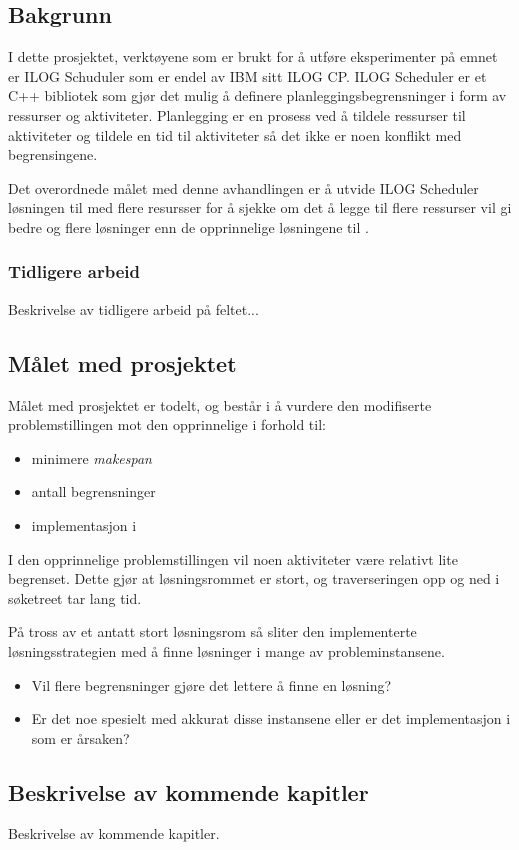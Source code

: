 \subsection{Bakgrunn}
I dette prosjektet, verktøyene som er brukt for å utføre eksperimenter på emnet er ILOG Schuduler som er endel av IBM sitt ILOG CP. ILOG Scheduler er et C++ bibliotek som gjør det mulig å definere planleggingsbegrensninger i form av ressurser og aktiviteter. Planlegging er en prosess ved å tildele ressurser til aktiviteter og tildele en tid til aktiviteter så det ikke er noen konflikt med begrensingene.\cite{Pape94implementationof}

Det overordnede målet med denne avhandlingen er å utvide ILOG Scheduler løsningen til \bht med flere resursser for å sjekke om det å legge til flere ressurser vil gi bedre og flere løsninger enn de opprinnelige løsningene til \bht.

\subsubsection{Tidligere arbeid}
Beskrivelse av tidligere arbeid på feltet...

\subsection{Målet med prosjektet}
Målet med prosjektet er todelt, og består i å vurdere den modifiserte problemstillingen mot den opprinnelige i forhold til:
\begin{itemize}
\item minimere \textit{makespan}
\item antall begrensninger
\item implementasjon i \ilog
\end{itemize}

I den opprinnelige problemstillingen vil noen aktiviteter være relativt lite begrenset. Dette gjør at løsningsrommet er stort, og traverseringen opp og ned i søketreet tar lang tid.

På tross av et antatt stort løsningsrom så sliter den \ilog implementerte løsningsstrategien med å finne løsninger i mange av probleminstansene.

\begin{itemize}
\item Vil flere begrensninger gjøre det lettere å finne en løsning?
\item Er det noe spesielt med akkurat disse instansene eller er det implementasjon i \ilog som er årsaken?
\end{itemize}

\subsection{Beskrivelse av kommende kapitler}
Beskrivelse av kommende kapitler.